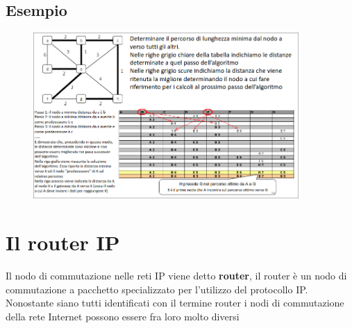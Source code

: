 \documentclass{report}
\begin{document}
            \subsection{Esempio}
                \begin{figure}[H]
                    \includegraphics[width=0.9\textwidth]{3/eseGraph.png}
                \end{figure}
        \section{Il router IP}
            Il nodo di commutazione nelle reti IP viene detto \textbf{router}, il router è un nodo di commutazione a pacchetto specializzato per l'utilizzo del protocollo IP.
            \\
            Nonostante siano tutti identificati con il termine router i nodi di commutazione della rete Internet possono essere fra loro molto diversi
\end{document}
